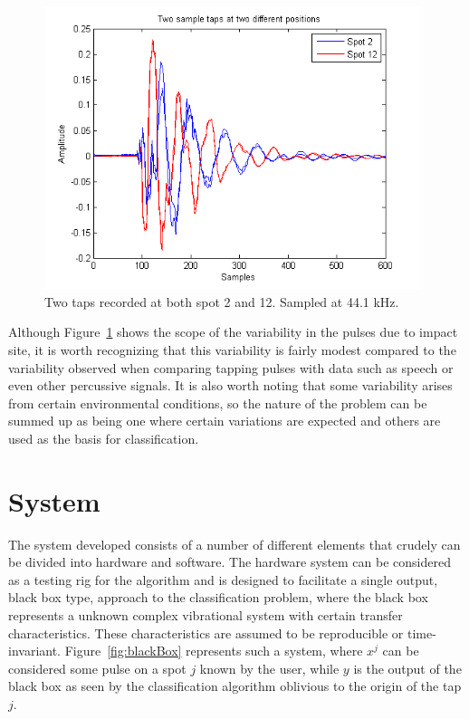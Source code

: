 \begin{figure}[t]
  \begin{center}
    \includegraphics[width=110mm]{twotwoSampleTap}
    \caption{Two taps recorded at both spot 2 and 12. Sampled at 44.1 kHz.}\label{fig:twotwoSampleTap}
  \end{center}
\end{figure}

Although Figure~\ref{fig:twotwoSampleTap} shows the scope of the variability in the pulses due to impact site, it is worth recognizing that this variability is fairly modest compared to the variability observed when comparing tapping pulses with data such as speech or even other percussive signals. It is also worth noting that some variability arises from certain environmental conditions, so the nature of the problem can be summed up as being one where certain variations are expected and others are used as the basis for classification.

\section{System}\label{sec:APRsystem}
The system developed consists of a number of different elements that crudely can be divided into hardware and software. The hardware system can be considered as a testing rig for the algorithm and is designed to facilitate a single output, black box type, approach to the classification problem, where the black box represents a unknown complex vibrational system with certain transfer characteristics. These characteristics are assumed to be reproducible or time-invariant. Figure~\ref{fig:blackBox} represents such a system, where $x^j$ can be considered some pulse on a spot $j$ known by the user, while $y$ is the output of the black box as seen by the classification algorithm oblivious to the origin of the tap $j$.


